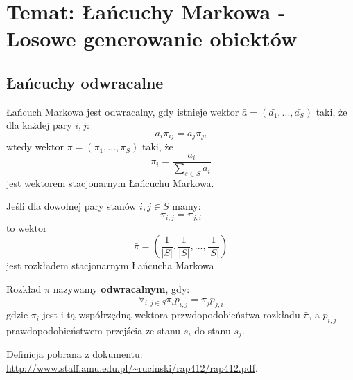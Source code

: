 \section[Wykład 9: 4-V-2017 - Temat: Łańcuchy Markowa - Losowe generowanie obiektów]{Temat: Łańcuchy Markowa - Losowe generowanie obiektów}
\subsection{Łańcuchy odwracalne}
\begin{definition}\label{def:OdwracalnoscLM}
Łańcuch Markowa jest odwracalny, gdy istnieje wektor $\bar{a}=(\bar{a_1}, ..., \bar{a_S})$ taki, że dla każdej pary $i,j$: $$a_i\pi _{ij}=a_j\pi _{ji}$$  wtedy wektor $\bar{\pi}=(\pi _1,...,\pi _S)$ taki, że $$\pi _i=\frac{a_i}{\sum _{s\in S}a_i}$$ jest wektorem stacjonarnym Łańcuchu Markowa.
\end{definition}
\begin{remark}
Jeśli dla dowolnej pary stanów $i,j\in S$ mamy: $$\pi_{i,j}=\pi_{j,i}$$ to wektor $$\bar{\pi}=\left(\frac{1}{|S|},\frac{1}{|S|},...,\frac{1}{|S|}\right)$$ jest rozkładem stacjonarnym Łańcucha Markowa
\end{remark}
\begin{definition}\label{def:OdwracalnoscLM2}
Rozkład $\bar{\pi}$ nazywamy \textbf{odwracalnym}, gdy: $$\forall _{i,j\in S} \pi _i p_{i,j}=\pi _j p_{j,i}$$ gdzie $\pi _i$ jest i-tą współrzędną wektora przwdopodobieństwa rozkładu $\bar{\pi}$, a $p_{i,j}$ prawdopodobieństwem przejścia ze stanu $s_i$ do stanu $s_j$.

Definicja pobrana z dokumentu: \url{http://www.staff.amu.edu.pl/~rucinski/rap412/rap412.pdf}.
\end{definition}


